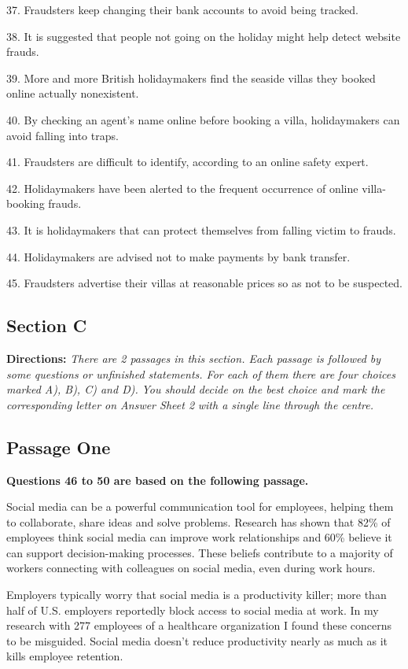\documentclass[UTF8,11pt]{ctexart}
\begin{document}
37. Fraudsters keep changing their bank accounts to avoid being tracked.


38. It is suggested that people not going on the holiday might help detect website frauds.


39. More and more British holidaymakers find the seaside villas they booked online actually nonexistent.


40. By checking an agent's name online before booking a villa, holidaymakers can avoid falling into traps.


41. Fraudsters are difficult to identify, according to an online safety expert.


42. Holidaymakers have been alerted to the frequent occurrence of online villa-booking frauds.


43. It is holidaymakers that can protect themselves from falling victim to frauds.


44. Holidaymakers are advised not to make payments by bank transfer.


45. Fraudsters advertise their villas at reasonable prices so as not to be suspected.


\subsection*{\textbf{Section C}}


\textbf{Directions: }\textit{There are 2 passages in this section. Each passage is followed by some questions} \textit{or unfinished statements. For each of them there are four choices marked A), B), C) and D).} \textit{You should decide on the best choice and mark the corresponding letter on Answer Sheet 2} \textit{with a single line through the centre.}


\subsection*{\textbf{Passage One}}


\textbf{Questions 46 to 50 are based on the following passage.}


Social media can be a powerful communication tool for employees, helping them to collaborate, share ideas and solve problems. Research has shown that 82\% of employees think social media can improve work relationships and 60\% believe it can support decision-making processes. These beliefs contribute to a majority of workers connecting with colleagues on social media, even during work hours.


Employers typically worry that social media is a productivity killer; more than half of U.S. employers reportedly block access to social media at work. In my research with 277 employees of a healthcare organization I found these concerns to be misguided. Social media doesn't reduce productivity nearly as much as it kills employee retention.
\end{document}
